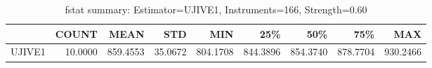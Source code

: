 \begin{table}[ht]
\centering
\caption{fstat summary: Estimator=UJIVE1, Instruments=166, Strength=0.60}
\begin{tabular}{lrrrrrrrr}
\toprule
 & COUNT & MEAN & STD & MIN & 25\% & 50\% & 75\% & MAX \\
\midrule
UJIVE1 & 10.0000 & 859.4553 & 35.0672 & 804.1708 & 844.3896 & 854.3740 & 878.7704 & 930.2466 \\
\bottomrule
\end{tabular}
\end{table}
